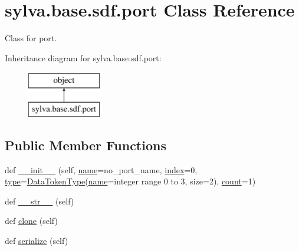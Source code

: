 \hypertarget{classsylva_1_1base_1_1sdf_1_1port}{}\section{sylva.\+base.\+sdf.\+port Class Reference}
\label{classsylva_1_1base_1_1sdf_1_1port}


Class for port.  


Inheritance diagram for sylva.\+base.\+sdf.\+port\+:\begin{figure}[H]
\begin{center}
\leavevmode
\includegraphics[height=2.000000cm]{classsylva_1_1base_1_1sdf_1_1port}
\end{center}
\end{figure}
\subsection*{Public Member Functions}
\begin{DoxyCompactItemize}
\item 
def \hyperlink{classsylva_1_1base_1_1sdf_1_1port_a648789838e7d9ff8d8cd26537ed006ad}{\+\_\+\+\_\+init\+\_\+\+\_\+} (self, \hyperlink{classsylva_1_1base_1_1sdf_1_1port_ace0eb23bb9f3e4a75e6a94f0961a6f99}{name}=\textquotesingle{}no\+\_\+port\+\_\+name\textquotesingle{}, \hyperlink{classsylva_1_1base_1_1sdf_1_1port_a4ed6db96ef0a6fb3d9b8f36c59bf7bdd}{index}=0, \hyperlink{classsylva_1_1base_1_1sdf_1_1port_af04b13138d55895bfd1083eb3e772f58}{type}=\hyperlink{classsylva_1_1base_1_1sdf_1_1_data_token_type}{Data\+Token\+Type}(\hyperlink{classsylva_1_1base_1_1sdf_1_1port_ace0eb23bb9f3e4a75e6a94f0961a6f99}{name}=\textquotesingle{}integer range 0 to 3\textquotesingle{}, size=2), \hyperlink{classsylva_1_1base_1_1sdf_1_1port_a628b66dd64830393bcf8d88b85023016}{count}=1)
\item 
def \hyperlink{classsylva_1_1base_1_1sdf_1_1port_a81a42bad6d299ec55b3d1482439d452f}{\+\_\+\+\_\+str\+\_\+\+\_\+} (self)
\item 
def \hyperlink{classsylva_1_1base_1_1sdf_1_1port_ae5c6adc9c86e717d12901d73699bb432}{clone} (self)
\item 
def \hyperlink{classsylva_1_1base_1_1sdf_1_1port_a19793d8e6190538a7d5cd014b08441b4}{serialize} (self)
\end{DoxyCompactItemize}
